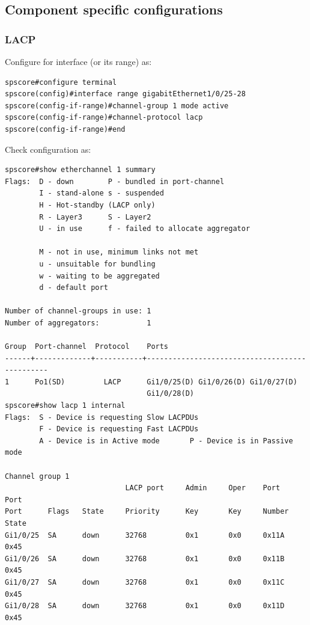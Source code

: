 \documentclass[a4paper,notitlepage]{article}
\begin{document}
\subsection{Component specific configurations}

\subsubsection{LACP}

Configure for interface (or its range) as:

\begin{verbatim}
spscore#configure terminal 
spscore(config)#interface range gigabitEthernet1/0/25-28
spscore(config-if-range)#channel-group 1 mode active 
spscore(config-if-range)#channel-protocol lacp
spscore(config-if-range)#end
\end{verbatim}

Check configuration as:

\begin{verbatim}
spscore#show etherchannel 1 summary 
Flags:  D - down        P - bundled in port-channel
        I - stand-alone s - suspended
        H - Hot-standby (LACP only)
        R - Layer3      S - Layer2
        U - in use      f - failed to allocate aggregator

        M - not in use, minimum links not met
        u - unsuitable for bundling
        w - waiting to be aggregated
        d - default port

Number of channel-groups in use: 1
Number of aggregators:           1

Group  Port-channel  Protocol    Ports
------+-------------+-----------+-----------------------------------------------
1      Po1(SD)         LACP      Gi1/0/25(D) Gi1/0/26(D) Gi1/0/27(D) 
                                 Gi1/0/28(D) 
spscore#show lacp 1 internal 
Flags:  S - Device is requesting Slow LACPDUs 
        F - Device is requesting Fast LACPDUs
        A - Device is in Active mode       P - Device is in Passive mode     

Channel group 1
                            LACP port     Admin     Oper    Port        Port
Port      Flags   State     Priority      Key       Key     Number      State
Gi1/0/25  SA      down      32768         0x1       0x0     0x11A       0x45  
Gi1/0/26  SA      down      32768         0x1       0x0     0x11B       0x45  
Gi1/0/27  SA      down      32768         0x1       0x0     0x11C       0x45  
Gi1/0/28  SA      down      32768         0x1       0x0     0x11D       0x45  
\end{verbatim}
\end{document}
